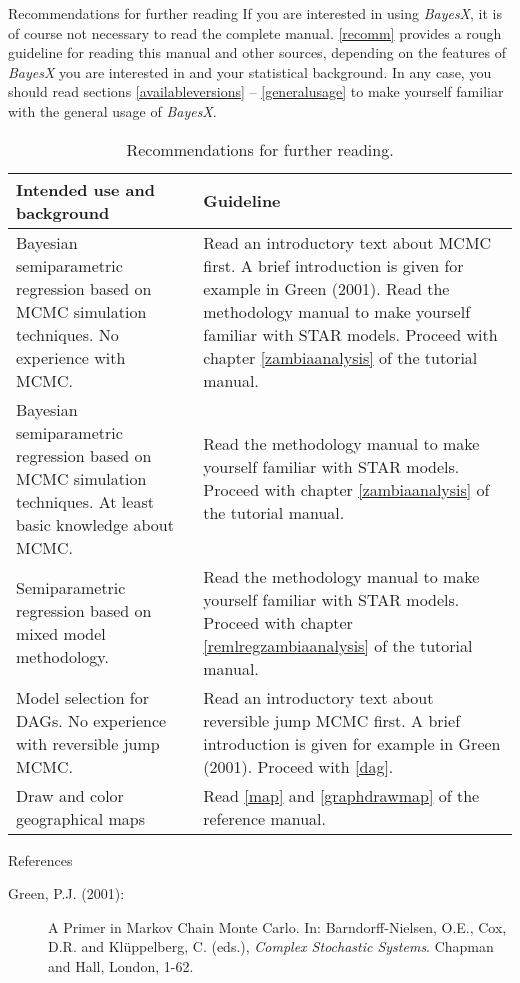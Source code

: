 \begin{stanza}{Recommendations for further reading}
If you are interested in using {\em BayesX}, it is of course not
necessary to read the complete manual. \autoref{recomm} provides a
rough guideline for reading this manual and other sources,
depending on the features of {\em BayesX} you are interested in
and your statistical background. In any case, you should read
sections \ref{availableversions} -- \ref{generalusage} to make
yourself familiar with the general usage of {\em BayesX}.

\begin{table}[ht] \footnotesize
\hspace{1cm}\begin{tabular}{ |p{7cm}|p{7.7cm}|}
 \hline
 {\bf Intended use and background} & {\bf Guideline} \\
 \hline\hline
 Bayesian semiparametric regression based on MCMC
 simulation techniques. No experience with MCMC.
 & Read an introductory text about MCMC first. A brief introduction is given
 for example in Green (2001). Read the methodology manual to make yourself
 familiar with STAR models.
 Proceed with chapter \ref*{zambiaanalysis} of the tutorial manual. \\
 \hline Bayesian semiparametric regression based on MCMC simulation
 techniques. At least basic knowledge about MCMC.
 & Read the methodology manual to make yourself familiar with STAR
 models. Proceed with chapter \ref*{zambiaanalysis} of the tutorial manual. \\
 \hline
 Semiparametric regression based on mixed model methodology. &
 Read the methodology manual to make yourself familiar with STAR
 models. Proceed with chapter \ref*{remlregzambiaanalysis} of the tutorial manual. \\
 \hline Model selection for DAGs. No experience with reversible jump
 MCMC. & Read an introductory text about reversible jump MCMC first.
 A brief introduction is given for example in Green (2001). Proceed with \autoref{dag}. \\
 \hline
 Draw and color geographical maps & Read \autoref{map} and \autoref{graphdrawmap} of the reference manual. \\
 \hline
\end{tabular}
\begin{center}
{\em \caption {\label{recomm} Recommendations for further
reading.}}
\end{center}
\end{table}
\end{stanza}

\begin{stanza}{References}

\begin{description}
\item[Green, P.J. (2001):] A Primer in Markov Chain Monte Carlo. In: Barndorff-Nielsen, O.E.,
Cox, D.R. and Kl{\"u}ppelberg, C. (eds.), {\em Complex Stochastic
Systems}. Chapman and Hall, London, 1-62.
\end{description}

\end{stanza}
